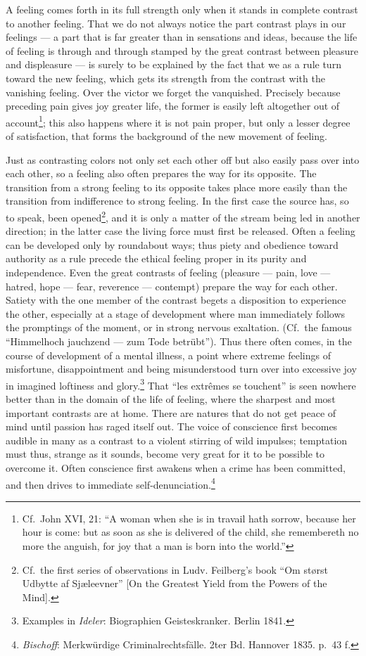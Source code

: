 \documentclass[12pt,a4paper]{book}
\newcommand{\opage}[1]{\marginnote{\footnotesize\textit{[#1]}}}
\begin{document}
A feeling comes forth in its full strength only when it stands in
complete contrast to another feeling. That we do not always notice the
part contrast plays in our feelings --- a part that is far greater than
in sensations and ideas, because the life of feeling is through and
through stamped by the great contrast between pleasure and displeasure
--- is surely to be explained by the fact that we as a rule turn toward
the new feeling, which gets its strength from the contrast with the
vanishing feeling. Over the victor we forget the vanquished. Precisely
because preceding pain gives joy greater life, the former is easily
left altogether out of
account\footnote{Cf.\ John XVI, 21: ``A woman when she is in travail
hath sorrow, because her hour is come: but as soon as she is delivered
of the child, she remembereth no more the anguish, for joy that a man is
born into the world.''}; this also happens where it is not pain proper,
but only a lesser degree of satisfaction, that forms the background of
the new movement of feeling.

Just as contrasting colors not only set each other off but also easily
pass over into each other, so a feeling also often prepares the way for
its opposite. The transition from
\opage{328}a strong feeling to its opposite takes place more easily than
the transition from indifference to strong feeling. In the first case
the source has, so to speak, been opened\footnote{Cf.\ the first series
of observations in Ludv. Feilberg's book ``Om størst Udbytte af
Sjæleevner'' [On the Greatest Yield from the Powers of the Mind].}, and
it is only a matter of the stream being led in another direction; in the
latter case the living force must first be released. Often a feeling
can be developed only by roundabout ways; thus piety and obedience
toward authority as a rule precede the ethical feeling proper in its
purity and independence. Even the great contrasts of feeling (pleasure
--- pain, love --- hatred, hope --- fear, reverence --- contempt)
prepare the way for each other. Satiety with the one member of the
contrast begets a disposition to experience the other, especially at a
stage of development where man immediately follows the promptings of the
moment, or in strong nervous exaltation. (Cf.\ the famous
``Himmelhoch jauchzend --- zum Tode betrübt''). Thus there often comes,
in the course of development of a mental illness, a point where extreme
feelings of misfortune, disappointment and being misunderstood turn over
into excessive joy in imagined loftiness and
glory.\footnote{Examples in \emph{Ideler}: Biographien
Geisteskranker. Berlin 1841.} That ``les extrêmes se touchent'' is seen
nowhere better than in the domain of the life of feeling, where the
sharpest and most important contrasts are at home. There are natures
that do not get peace of mind until passion has raged itself out. The
voice of conscience first becomes audible in many as a contrast to a
violent stirring of wild impulses; temptation must thus, strange as it
sounds, become very great for it to be possible to overcome it. Often
conscience first awakens when a crime has been committed, and then drives
to immediate self-denunciation.\footnote{\emph{Bischoff}: Merkwürdige
Criminalrechtsfälle. 2ter Bd. Hannover 1835. p.~43 f.}
\end{document}
